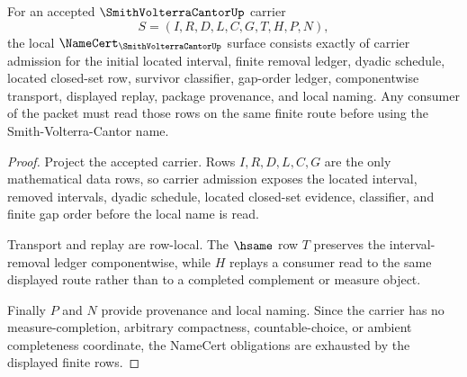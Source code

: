 \begin{theorem}
\label{thm:smith-volterra-cantor-namecert-obligations}
For an accepted $\SmithVolterraCantorUp$ carrier
$$
S=(I,R,D,L,C,G,T,H,P,N),
$$
the local $\NameCert_{\SmithVolterraCantorUp}$ surface consists exactly of carrier admission for the initial located interval, finite removal ledger, dyadic schedule, located closed-set row, survivor classifier, gap-order ledger, componentwise transport, displayed replay, package provenance, and local naming. Any consumer of the packet must read those rows on the same finite route before using the Smith-Volterra-Cantor name.
\end{theorem}
\begin{proof}
Project the accepted carrier. Rows $I,R,D,L,C,G$ are the only mathematical data rows, so carrier admission exposes the located interval, removed intervals, dyadic schedule, located closed-set evidence, classifier, and finite gap order before the local name is read.

Transport and replay are row-local. The $\hsame$ row $T$ preserves the interval-removal ledger componentwise, while $H$ replays a consumer read to the same displayed route rather than to a completed complement or measure object.

Finally $P$ and $N$ provide provenance and local naming. Since the carrier has no measure-completion, arbitrary compactness, countable-choice, or ambient completeness coordinate, the NameCert obligations are exhausted by the displayed finite rows.
\end{proof}


